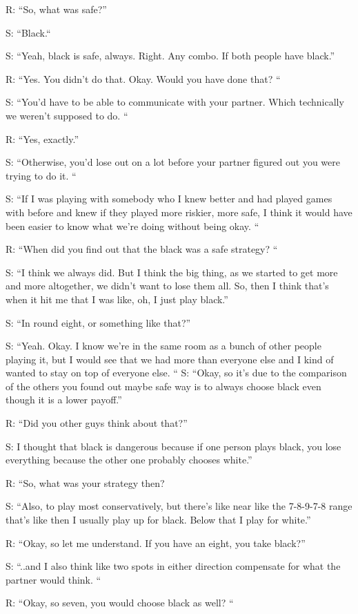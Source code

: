 R: “So, what was safe?”

S: “Black.“

S: “Yeah, black is safe, always. Right. Any combo. If both people have black.” 

R: “Yes. You didn't do that. Okay. Would you have done that? “

S: “You'd have to be able to communicate with your partner. Which technically we weren't supposed to do. “

R: “Yes, exactly.”

S: “Otherwise, you'd lose out on a lot before your partner figured out you were trying to do it. “

S: “If I was playing with somebody who I knew better and had played games with before and knew if they played more riskier, more safe, I think it would have been easier to know what we're doing without being okay. “

R: “When did you find out that the black was a safe strategy? “

S: “I think we always did. But I think the big thing, as we started to get more and more altogether, we didn't want to lose them all. So, then I think that's when it hit me that I was like, oh, I just play black.”

S: “In round eight, or something like that?”

S: “Yeah. Okay. I know we're in the same room as a bunch of other people playing it, but I would see that we had more than everyone else and I kind of wanted to stay on top of everyone else. “
S: “Okay, so it's due to the comparison of the others you found out maybe safe way is to always choose black even though it is a lower payoff.”

R: “Did you other guys think about that?” 

S: I thought that black is dangerous because if one person plays black, you lose everything because the other one probably chooses white.”

R: “So, what was your strategy then? 

S: “Also, to play most conservatively, but there's like near like the 7-8-9-7-8 range that's like then I usually play up for black. Below that I play for white.” 

R: “Okay, so let me understand. If you have an eight, you take black?”

S: “..and I also think like two spots in either direction compensate for what the partner would think. “

R: “Okay, so seven, you would choose black as well? “

